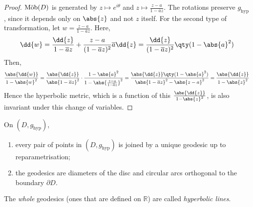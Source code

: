 \begin{proof}
	$\text{M\"ob}(D)$ is generated by $z \mapsto e^{i\theta}$ and $z \mapsto \frac{z-a}{1-\overline a z}$.
	The rotations preserve $g_{\text{hyp}}$, since it depends only on $\abs{z}$ and not $z$ itself.
	For the second type of transformation, let $w = \frac{z-a}{1-\overline a z}$.
	Here,
	\begin{align*}
		\dd{w} = \frac{\dd{z}}{1-\overline a z} + \frac{z-a}{(1-\overline a z)^2} \overline a \dd{z} = \frac{\dd{z}}{(1-\overline a z)^2} \qty(1 - \abs{a}^2)
	\end{align*}
	Then,
	\begin{align*}
		\frac{\abs{\dd{w}}}{1-\abs{w}^2} = \frac{\abs{\dd{z}}}{\abs{1-\overline a z}^2} \cdot \frac{1 - \abs{a}^2}{1-\abs{\frac{z-a}{1-\overline a z}}^2} = \frac{\abs{\dd{z}} \qty(1-\abs{a}^2)}{\abs{1-\overline a z}^2 - \abs{z-a}^2} = \frac{\abs{\dd{z}}}{1-\abs{z}^2}
	\end{align*}
	Hence the hyperbolic metric, which is a function of this $\frac{\abs{\dd{z}}}{1-\abs{z}^2}$, is also invariant under this change of variables.
\end{proof}
\begin{lemma}
	On $(D, g_{\text{hyp}})$,
	\begin{enumerate}
		\item every pair of points in $(D, g_{\text{hyp}})$ is joined by a unique geodesic up to reparametrisation;
		\item the geodesics are diameters of the disc and circular arcs orthogonal to the boundary $\partial D$.
	\end{enumerate}
	The \textit{whole} geodesics (ones that are defined on $\mathbb R$) are called \textit{hyperbolic lines}.
\end{lemma}
